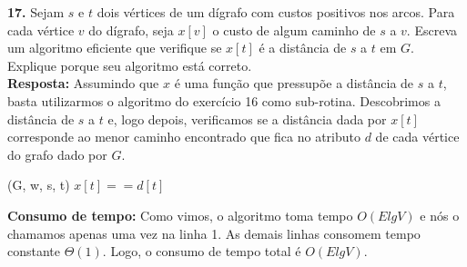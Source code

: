 
\noindent\textbf{17.} Sejam $s$ e $t$ dois vértices de um dígrafo com custos positivos nos arcos. Para cada vértice $v$ do dígrafo, seja $x[v]$ o custo de algum caminho de $s$ a $v$. Escreva um algoritmo eficiente que verifique se $x[t]$ é a distância de $s$ a $t$ em $G$. Explique porque seu algoritmo está correto.\\[6pt]
\textbf{Resposta:} Assumindo que $x$ é uma função que pressupõe a distância de $s$ a $t$, basta utilizarmos o algoritmo  do exercício 16 como sub-rotina. Descobrimos a distância de $s$ a $t$ e, logo depois, verificamos se a distância dada por $x[t]$ corresponde ao menor caminho encontrado que fica no atributo $d$ de cada vértice do grafo dado por $G$.

\begin{codebox}
\li {}(G, w, s, t)
\li \If $x[t] == d[t]$
\li	\Then
		\Return {}
\li \Else
\li     \Return {}
\end{codebox}

\textbf{Consumo de tempo:} Como vimos, o algoritmo  toma tempo $O(E lg V)$ e nós o chamamos apenas uma vez na linha 1. As demais linhas consomem tempo constante $\Theta(1)$. Logo, o consumo de tempo total é $O(E lg V)$.\\[6pt]